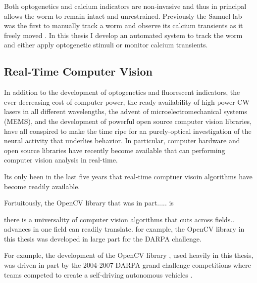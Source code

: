 
Both optogenetics and calcium indicators are non-invasive and thus in principal allows the worm to remain intact and unrestrained. Previously the Samuel lab was the first to manually track a worm and observe its calcium transients as it freely moved \citep{clark_temporal_2007}. In this thesis I develop an automated system to track the worm and either apply optogenetic stimuli or monitor calcium transients.



\subsection{Real-Time Computer Vision}


In addition to the development of optogenetics and fluorescent indicators, the ever decreasing cost of computer power, the ready availability of high power CW lasers in all different wavelengths,  the advent of microelectromechanical systems (MEMS), and the development of powerful open source computer vision libraries, have  all conspired to make the time ripe for an purely-optical investigation of the neural activity that underlies behavior. In particular, computer hardware and open source libraries have recently become available that can performing computer vision analysis in real-time.


Its only been in the last five years that real-time comptuer visoin algorithms have become readily available. 

Fortuitously, the OpenCV library that was in part..... is 

there is a universality of computer vision algorithms that cuts across fields.. advances in one field can readily translate. for example, the OpenCV library in this thesis was developed in large part for the DARPA challenge. 



 For example, the development of the OpenCV library \citep{bradski_opencv_2000,bradski_learning_2008}, used heavily in this thesis, was driven in part by the 2004-2007 DARPA grand challenge competitions where teams competed to create a self-driving autonomous vehicles \citep{stavens_learning_2011,buehler_stanley:_2007}.




